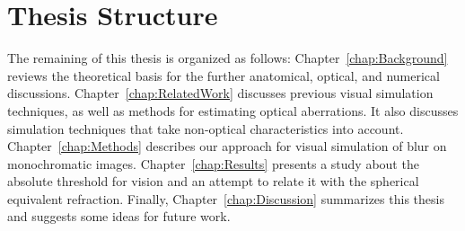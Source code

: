 
\section{Thesis Structure}
\label{sec:ThesisStructure}

The remaining of this thesis is organized as follows: Chapter~\ref{chap:Background} reviews the theoretical basis for the further anatomical, optical, and numerical discussions. Chapter~\ref{chap:RelatedWork} discusses previous visual simulation techniques, as well as methods for estimating optical aberrations. It also discusses simulation techniques that take non-optical characteristics into account. 
Chapter~\ref{chap:Methods} describes our approach for visual simulation of blur on monochromatic images. 
Chapter~\ref{chap:Results} presents a study about the absolute threshold for vision and an attempt to relate it with the spherical equivalent refraction. 
Finally, Chapter~\ref{chap:Discussion} summarizes this thesis and suggests some ideas for future work.



